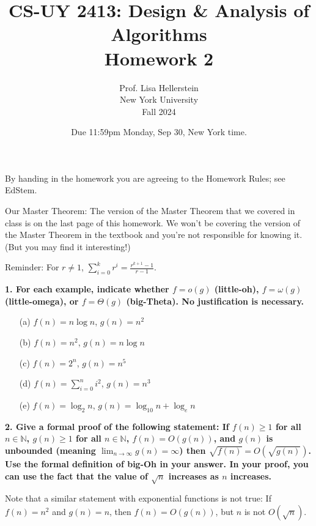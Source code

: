 \documentclass{article}
\title{CS-UY 2413: Design \& Analysis of Algorithms\\Homework 2}
\author{Prof. Lisa Hellerstein\\New York University\\Fall 2024}
\date{Due 11:59pm Monday, Sep 30, New York time.}
\begin{document}
\maketitle

\vspace{1cm}

By handing in the homework you are agreeing to the Homework Rules; see EdStem.

Our Master Theorem: The version of the Master Theorem that we covered in class is on the last page of this homework. We won’t be covering the version of the Master Theorem in the textbook and you’re not responsible for knowing it. (But you may find it interesting!)

Reminder: For $r \neq 1$, $\sum_{i=0}^k r^i = \frac{r^{k+1} - 1}{r - 1}$.

\vspace{1cm}

\noindent \textbf{1. For each example, indicate whether $f = o(g)$ (little-oh), $f = \omega(g)$ (little-omega), or $f = \Theta(g)$ (big-Theta). No justification is necessary.}

\begin{enumerate}
    \item[(a)] $f(n) = n \log n$, $g(n) = n^2$
    \item[(b)] $f(n) = n^2$, $g(n) = n \log n$
    \item[(c)] $f(n) = 2^n$, $g(n) = n^5$
    \item[(d)] $f(n) = \sum_{i=0}^n i^2$, $g(n) = n^3$
    \item[(e)] $f(n) = \log_2 n$, $g(n) = \log_{10} n + \log_e n$
\end{enumerate}

\vspace{1cm}

\noindent \textbf{2. Give a formal proof of the following statement: If $f(n) \ge 1$ for all $n \in \mathbb{N}$, $g(n) \ge 1$ for all $n \in \mathbb{N}$, $f(n) = O(g(n))$, and $g(n)$ is unbounded (meaning $\lim_{n \to \infty} g(n) = \infty$) then $\sqrt{f(n)} = O(\sqrt{g(n)})$. Use the formal definition of big-Oh in your answer. In your proof, you can use the fact that the value of $\sqrt{n}$ increases as $n$ increases.}

Note that a similar statement with exponential functions is not true: If $f(n) = n^2$ and $g(n) = n$, then $f(n) = O(g(n))$, but $n$ is not $O(\sqrt{n})$.
\end{document}
